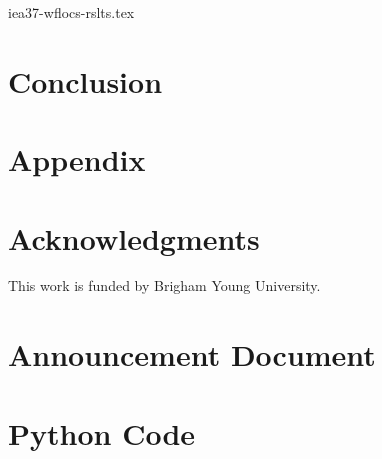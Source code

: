\documentclass[]{aiaa-tc} %
\begin{document}
	{iea37-wflocs-rslts.tex}

\section{Conclusion}


\pagebreak
\section*{Appendix}

\section*{Acknowledgments}
This work is funded by Brigham Young University.

\section{Announcement Document}
\label{app:anndoc}


\section{Python Code}
\label{app:aepcalc}


\FloatBarrier

\pagebreak


\end{document}
